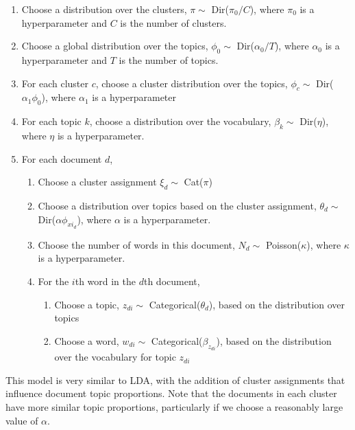\documentclass{article}
\begin{document}
\begin{enumerate}
\item Choose a distribution over the clusters, $\pi \sim$ Dir($\pi_0/C$), where $\pi_0$ is a hyperparameter and $C$ is the number of clusters.
\item Choose a global distribution over the topics, $\phi_0 \sim$ Dir($\alpha_0/T$), where $\alpha_0$ is a hyperparameter and $T$ is the number of topics.
\item For each cluster $c$, choose a cluster distribution over the topics, $\phi_c \sim$ Dir($\alpha_1 \phi_0$), where $\alpha_1$ is a hyperparameter
\item For each topic $k$, choose a distribution over the vocabulary, $\beta_k \sim$ Dir($\eta$), where $\eta$ is a hyperparameter.
\item For each document $d$,
\begin{enumerate}
\item Choose a cluster assignment $\xi_d \sim$ Cat($\pi$)
\item Choose a distribution over topics based on the cluster assignment, $\theta_d \sim$ Dir($\alpha \phi_{xi_d}$), where $\alpha$ is a hyperparameter.
\item Choose the number of words in this document, $N_d \sim$ Poisson($\kappa$), where $\kappa$ is a hyperparameter.
\item For the $i$th word in the $d$th document,
\begin{enumerate}
\item Choose a topic, $z_{di} \sim$ Categorical($\theta_d$), based on the distribution over topics
\item Choose a word, $w_{di} \sim$ Categorical($\beta_{z_{di}}$), based on the distribution over the vocabulary for topic $z_{di}$
\end{enumerate}
\end{enumerate}
\end{enumerate}

This model is very similar to LDA, with the addition of cluster assignments that influence document topic proportions. Note that the documents in each cluster have more similar topic proportions, particularly if we choose a reasonably large value of $\alpha$.
\end{document}
